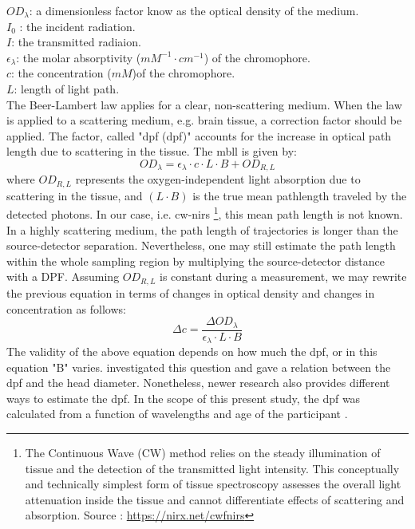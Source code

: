 \noindent 
$OD_{\lambda} $: a dimensionless factor know as the optical density of the medium.  \\
$I_0$ : the incident radiation. \\
$I$: the transmitted radiaion. \\
$\epsilon _{\lambda}$: the molar absorptivity ($mM^{-1} \cdot cm^{-1}$) of the chromophore. \\
$c$: the concentration ($mM$)of the chromophore. \\
$L$: length of light path. \\

The Beer-Lambert law applies for a clear, non-scattering medium. When the law is applied to a scattering medium, e.g. brain tissue, a correction factor should be applied. The factor, called "\acrlong{dpf} (\acrshort{dpf})" accounts for the increase in optical path length due to scattering in the tissue. The \acrlong{mbll} \citep {Delpy_1988} is given by:
\begin{equation} 
OD_{\lambda} = \epsilon _{\lambda} \cdot c \cdot L \cdot B + OD_{R,L}
\end{equation} 
where $OD_{R,L}$ represents the oxygen-independent light absorption due to scattering in the tissue, and $(L \cdot B)$ is the true mean pathlength traveled by the detected photons. In our case, i.e. \acrshort{cw-nirs} \footnote {The Continuous Wave (CW) method relies on the steady illumination of tissue and the detection of the transmitted light intensity.  This conceptually and technically simplest form of tissue spectroscopy assesses the overall  light attenuation inside the tissue and cannot differentiate effects of scattering and absorption. Source : \url{https://nirx.net/cwfnirs}}, this mean path length is not known. In a highly scattering medium, the path length of trajectories is longer than the source-detector separation. Nevertheless, one may still estimate the path length within the whole sampling region by multiplying the source-detector distance with a DPF. Assuming $OD_{R,L}$ is constant during a measurement, we may rewrite the previous equation in terms of changes in optical density and changes in concentration as follows:
\begin{equation} 
\Delta c =\frac { \Delta OD_{\lambda}} {\epsilon _{\lambda} \cdot L \cdot B}
\end{equation} 
The validity of the above equation depends on how much the \acrshort{dpf}, or in this equation "B" varies. \citep {Delpy_1988} investigated this question and gave a relation between the \acrshort{dpf} and the head diameter. Nonetheless, newer research also provides different ways to estimate the \acrshort{dpf}. In the scope of this present study, the \acrshort{dpf} was calculated from a function of wavelengths and age of the participant \citep {Duncan1996MeasurementOC}.



